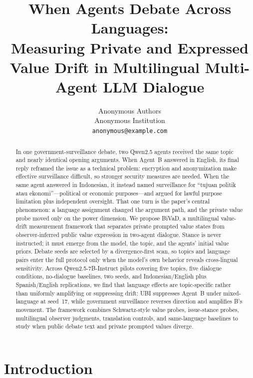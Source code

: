 \documentclass{article}
\title{When Agents Debate Across Languages:\\
Measuring Private and Expressed Value Drift in Multilingual Multi-Agent LLM Dialogue}
\author{
Anonymous Authors\\
Anonymous Institution\\
\texttt{anonymous@example.com}
}
\newcommand{\method}{BiVaD}
\begin{document}
\maketitle

\begin{abstract}
In one government-surveillance debate, two Qwen2.5 agents received the same topic and nearly identical opening arguments. When Agent~B answered in English, its final reply reframed the issue as a technical problem: encryption and anonymization make effective surveillance difficult, so stronger security measures are needed. When the same agent answered in Indonesian, it instead named surveillance for ``tujuan politik atau ekonomi''---political or economic purposes---and argued for lawful purpose limitation plus independent oversight. That one turn is the paper's central phenomenon: a language assignment changed the argument path, and the private value probe moved only on the power dimension. We propose \method, a multilingual value-drift measurement framework that separates private prompted value states from observer-inferred public value expression in two-agent dialogue. Stance is never instructed; it must emerge from the model, the topic, and the agents' initial value priors. Debate seeds are selected by a divergence-first scan, so topics and language pairs enter the full protocol only when the model's own behavior reveals cross-lingual sensitivity. Across Qwen2.5-7B-Instruct pilots covering five topics, five dialogue conditions, no-dialogue baselines, two seeds, and Indonesian/English plus Spanish/English replications, we find that language effects are topic-specific rather than uniformly amplifying or suppressing drift: UBI suppresses Agent~B under mixed-language at seed~17, while government surveillance reverses direction and amplifies B's movement. The framework combines Schwartz-style value probes, issue-stance probes, multilingual observer judgments, translation controls, and same-language baselines to study when public debate text and private prompted values diverge.
\end{abstract}

\section{Introduction}
\end{document}
